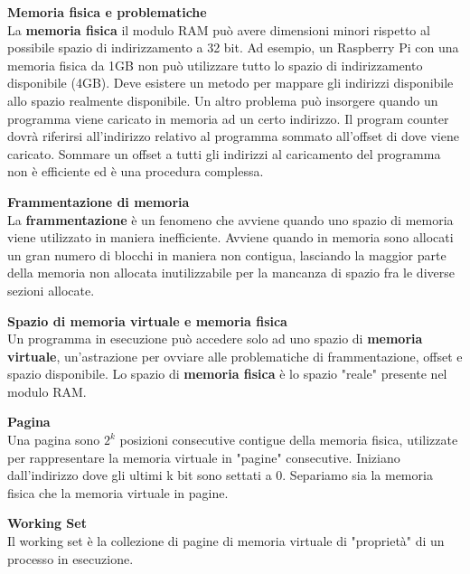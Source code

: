 \begin{defn}
    \textbf{Memoria fisica e problematiche} \\
    La \textbf{memoria fisica} il modulo RAM può avere dimensioni minori
    rispetto al possibile spazio di indirizzamento a 32 bit. Ad esempio, un
    Raspberry Pi con una memoria fisica da 1GB non può utilizzare tutto lo
    spazio di indirizzamento disponibile (4GB). Deve esistere un metodo per
    mappare gli indirizzi disponibile allo spazio realmente disponibile. Un
    altro problema può insorgere quando un programma viene caricato in memoria
    ad un certo indirizzo. Il program counter dovrà riferirsi all'indirizzo
    relativo al programma sommato all'offset di dove viene caricato. Sommare un
    offset a tutti gli indirizzi al caricamento del programma non è efficiente
    ed è una procedura complessa.
\end{defn}

\begin{defn}
    \textbf{Frammentazione di memoria } \\
    La \textbf{frammentazione} è un fenomeno che avviene quando uno spazio di
    memoria viene utilizzato in maniera inefficiente. Avviene quando in memoria
    sono allocati un gran numero di blocchi in maniera non contigua, lasciando
    la maggior parte della memoria non allocata inutilizzabile per la mancanza
    di spazio fra le diverse sezioni allocate.
\end{defn}

\begin{defn}
    \textbf{Spazio di memoria virtuale e memoria fisica} \\
    Un programma in esecuzione può accedere solo ad uno spazio di
    \textbf{memoria virtuale}, un'astrazione per ovviare alle problematiche di
    frammentazione, offset e spazio disponibile. Lo spazio di \textbf{memoria
    fisica} è lo spazio "reale" presente nel modulo RAM.
\end{defn}

\begin{defn}
    \textbf{Pagina} \\
    Una pagina sono $2^k$ posizioni consecutive contigue della memoria fisica,
    utilizzate per rappresentare la memoria virtuale in "pagine" consecutive.
    Iniziano dall'indirizzo dove gli ultimi k bit sono settati a 0. Separiamo
    sia la memoria fisica che la memoria virtuale in pagine.
\end{defn}

\begin{defn}
    \textbf{Working Set} \\
    Il working set è la collezione di pagine di memoria virtuale di "proprietà"
    di un processo in esecuzione.
\end{defn}


